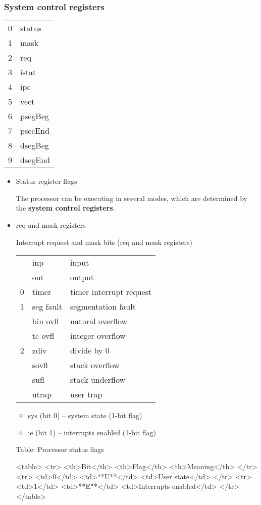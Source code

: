 \documentclass[11pt]{article}
\begin{document}
\subsubsection*{System control registers}
\label{sec:org74f8f2a}

\begin{center}
\begin{tabular}{rl}
\hline
0 & status\\
1 & mask\\
2 & req\\
3 & istat\\
4 & ipc\\
5 & vect\\
6 & psegBeg\\
7 & psecEnd\\
8 & dsegBeg\\
9 & dsegEnd\\
\hline
\end{tabular}
\end{center}

\begin{itemize}
\item Status register flags
\label{sec:org83e95f3}

The processor can be executing in several modes, which are determined
by the \textbf{\textbf{system control registers}}.

\item req and mask registers
\label{sec:orgecb88ce}

Interrupt request and mask bits (req and mask registers)

\begin{center}
\begin{tabular}{rll}
 & inp & input\\
 & out & output\\
0 & timer & timer interrupt request\\
1 & seg fault & segmentation fault\\
 & bin ovfl & natural overflow\\
 & tc ovfl & integer overflow\\
2 & zdiv & divide by 0\\
 & sovfl & stack overflow\\
 & sufl & stack underflow\\
 & utrap & user trap\\
\end{tabular}
\end{center}

\begin{itemize}
\item sys (bit 0)  -- system state (1-bit flag)

\item ie (bit 1)   -- interrupts enabled (1-bit flag)
\end{itemize}

Table: Processor status flags

<table>
  <tr>
    <th>Bit</th>
    <th>Flag</th>
    <th>Meaning</th>
  </tr>
  <tr>
    <td>0</td>
    <td>**U**</td>
    <td>User state</td>
  </tr>
  <tr>
    <td>1</td>
    <td>**E**</td>
    <td>Interrupts enabled</td>
  </tr>
</table>
\end{itemize}
\end{document}
